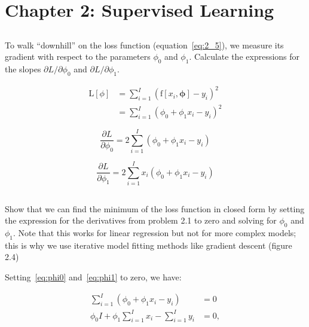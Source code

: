 \documentclass[12pt]{report}
\begin{document}
\section*{Chapter 2: Supervised Learning}

\subsection{}
\begin{mdframed}
    To walk ``downhill'' on the loss function (equation~\eqref{eq:2_5}), we measure its gradient with respect to the parameters $\phi_{0}$ and $\phi_{1}$. Calculate the expressions for the slopes $\partial L / \partial \phi_{0}$ and $\partial L / \partial \phi_{1}$.

    \begin{align*}
        \text{L}[\phi] & = \sum_{i=1}^{I}(\text{f}[x_{i}, \boldsymbol{\phi}]-y_{i})^{2} \\
                       & = \sum_{i=1}^{I}(\phi_{0} + \phi_{1}x_{i} - y_{i})^{2}
        \label{eq:2_5}
        \tag{2.5}
    \end{align*}
\end{mdframed}

\begin{equation}
    \frac{\partial L}{\partial \phi_{0}} = 2\sum_{i=1}^{I}(\phi_{0} + \phi_{1}x_{i} - y_{i})
    \label{eq:phi0}
\end{equation}

\begin{equation}
    \frac{\partial L}{\partial \phi_{1}} = 2\sum_{i=1}^{I}x_{i}(\phi_{0} + \phi_{1}x_{i} - y_{i})
    \label{eq:phi1}
\end{equation}

\subsection{}
\begin{mdframed}
    Show that we can find the minimum of the loss function in closed form by setting the expression for the derivatives from problem 2.1 to zero and solving for $\phi_{0}$ and $\phi_{1}$. Note that this works for linear regression but not for more complex models; this is why we use iterative model fitting methods like gradient descent (figure 2.4)
\end{mdframed}

Setting~\eqref{eq:phi0} and~\eqref{eq:phi1} to zero, we have:

\begin{align}
    \sum_{i=1}^{I}(\phi_{0} + \phi_{1}x_{i} - y_{i})              & = 0  \\
    \phi_{0}I + \phi_{1}\sum_{i=1}^{I}x_{i} - \sum_{i=1}^{I}y_{i} & = 0,
    \label{eq:phi0_zero}
\end{align}
\end{document}

